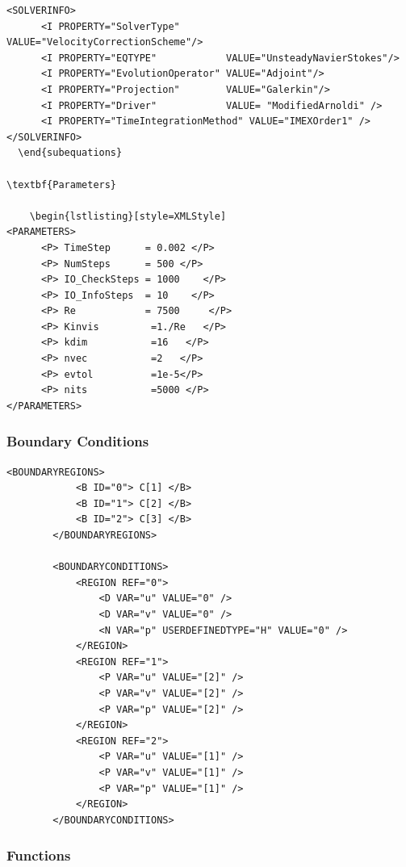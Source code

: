     \begin{lstlisting}[style=XMLStyle]
<SOLVERINFO>
      <I PROPERTY="SolverType"        VALUE="VelocityCorrectionScheme"/>
      <I PROPERTY="EQTYPE"            VALUE="UnsteadyNavierStokes"/>
      <I PROPERTY="EvolutionOperator" VALUE="Adjoint"/>
      <I PROPERTY="Projection"        VALUE="Galerkin"/>
      <I PROPERTY="Driver"            VALUE= "ModifiedArnoldi" />
      <I PROPERTY="TimeIntegrationMethod" VALUE="IMEXOrder1" />    
</SOLVERINFO>
  \end{subequations}

\textbf{Parameters}

    \begin{lstlisting}[style=XMLStyle]
<PARAMETERS>
      <P> TimeStep      = 0.002 </P>
      <P> NumSteps      = 500 </P>
      <P> IO_CheckSteps = 1000    </P>
      <P> IO_InfoSteps  = 10    </P>
      <P> Re            = 7500     </P>
      <P> Kinvis         =1./Re   </P>
      <P> kdim           =16   </P>
      <P> nvec           =2   </P>
      <P> evtol          =1e-5</P>
      <P> nits           =5000 </P>
</PARAMETERS>
  \end{lstlisting}

\subsubsection{Boundary Conditions}

    \begin{lstlisting}[style=XMLStyle]
 <BOUNDARYREGIONS>
            <B ID="0"> C[1] </B>
            <B ID="1"> C[2] </B>
            <B ID="2"> C[3] </B>
        </BOUNDARYREGIONS>

        <BOUNDARYCONDITIONS>
            <REGION REF="0">
                <D VAR="u" VALUE="0" />
                <D VAR="v" VALUE="0" />
                <N VAR="p" USERDEFINEDTYPE="H" VALUE="0" />
            </REGION>
            <REGION REF="1">
                <P VAR="u" VALUE="[2]" />
                <P VAR="v" VALUE="[2]" />
                <P VAR="p" VALUE="[2]" />
            </REGION>
            <REGION REF="2">
                <P VAR="u" VALUE="[1]" />
                <P VAR="v" VALUE="[1]" />
                <P VAR="p" VALUE="[1]" />
            </REGION>
        </BOUNDARYCONDITIONS>
  \end{lstlisting}


\subsubsection{Functions}

